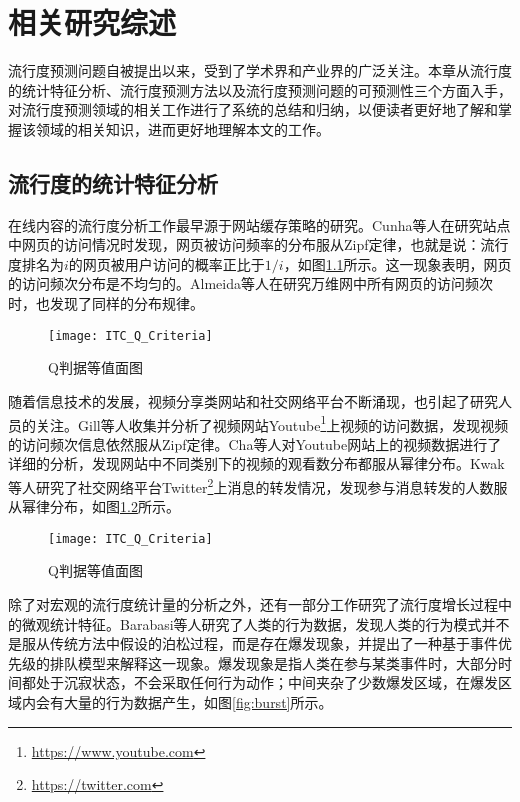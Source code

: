 
\chapter{相关研究综述}
\label{chap:relatedwork}
流行度预测问题自被提出以来，受到了学术界和产业界的广泛关注。本章从流行度的统计特征分析、流行度预测方法以及流行度预测问题的可预测性三个方面入手，对流行度预测领域的相关工作进行了系统的总结和归纳，以便读者更好地了解和掌握该领域的相关知识，进而更好地理解本文的工作。

\section{流行度的统计特征分析}
在线内容的流行度分析工作最早源于网站缓存策略的研究。Cunha等人\citep{chen2005zhulu}在研究站点中网页的访问情况时发现，网页被访问频率的分布服从Zipf定律\citep{chen2005zhulu}，也就是说：流行度排名为$i$的网页被用户访问的概率正比于$1/i$，如图\ref{fig:pageDist}所示。这一现象表明，网页的访问频次分布是不均匀的。Almeida等人\citep{chen2005zhulu}在研究万维网中所有网页的访问频次时，也发现了同样的分布规律。
\begin{figure}[!htbp]
  \centering
  \texttt{[image: ITC\_Q\_Criteria]}
  \caption{Q判据等值面图}
  \label{fig:pageDist}
\end{figure}

随着信息技术的发展，视频分享类网站和社交网络平台不断涌现，也引起了研究人员的关注。Gill等人\citep{chen2005zhulu}收集并分析了视频网站Youtube\footnote{\url{https://www.youtube.com}}上视频的访问数据，发现视频的访问频次信息依然服从Zipf定律。Cha等人\citep{chen2005zhulu}对Youtube网站上的视频数据进行了详细的分析，发现网站中不同类别下的视频的观看数分布都服从幂律分布。Kwak等人\citep{chen2005zhulu}研究了社交网络平台Twitter\footnote{\url{https://twitter.com}}上消息的转发情况，发现参与消息转发的人数服从幂律分布，如图\ref{fig:tweetDist}所示。
\begin{figure}[!htbp]
  \centering
  \texttt{[image: ITC\_Q\_Criteria]}
  \caption{Q判据等值面图}
  \label{fig:tweetDist}
\end{figure}

除了对宏观的流行度统计量的分析之外，还有一部分工作研究了流行度增长过程中的微观统计特征。Barabasi等人\citep{chen2005zhulu}研究了人类的行为数据，发现人类的行为模式并不是服从传统方法中假设的泊松过程，而是存在爆发现象，并提出了一种基于事件优先级的排队模型来解释这一现象。爆发现象是指人类在参与某类事件时，大部分时间都处于沉寂状态，不会采取任何行为动作；中间夹杂了少数爆发区域，在爆发区域内会有大量的行为数据产生，如图\ref{fig:burst}所示。

